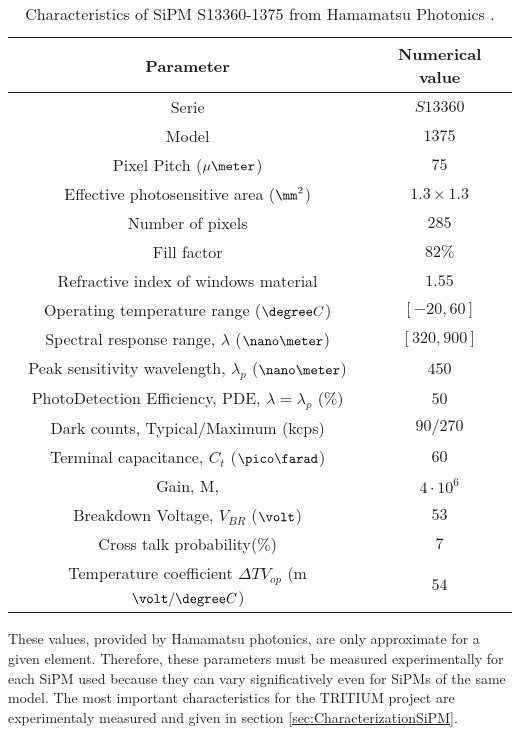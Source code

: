 \begin{table}[htbp]
\begin{center}
\begin{tabular}{|c|c|}
\hline
Parameter & Numerical value \\
\hline \hline \hline
Serie & $S13360$ \\ \hline
Model & $1375$ \\ \hline
Pixel Pitch ($\mu\meter$) & $75$ \\ \hline
Effective photosensitive area ($\mm^2$) & $1.3 \times 1.3$ \\ \hline
Number of pixels & $285$ \\ \hline
Fill factor & $82\%$ \\ \hline
Refractive index of windows material & $1.55$ \\ \hline
Operating temperature range ($\degree C$)& $[-20,60]$ \\ \hline
Spectral response range, $\lambda$ ($\nano\meter$) & $[320, 900]$ \\ \hline
Peak sensitivity wavelength, $\lambda_p$ ($\nano\meter$) & $450$ \\ \hline
PhotoDetection Efficiency, PDE, $\lambda=\lambda_p$ ($\%$) & $50$ \\ \hline
Dark counts, Typical/Maximum (kcps) & $90/270$ \\ \hline
Terminal capacitance, $C_t$ ($\pico\farad$) & $60$ \\ \hline
Gain, M, & $4 \cdot{} 10^6$ \\ \hline
Breakdown Voltage, $V_{BR}$ ($\volt$) & $53$ \\ \hline
Cross talk probability($\%$) & $7$ \\ \hline
Temperature coefficient $\Delta TV_{op}$ (m$\volt/\degree C$) & $54$ \\ \hline
\end{tabular}
\caption{Characteristics of SiPM S13360-1375 from Hamamatsu Photonics \cite{DataSheetHammamatsu_1_SiPM_1375}.}
\label{tab:PropertiesOfSiPM1375}
\end{center}
\end{table}

These values, provided by Hamamatsu photonics, are only approximate for a given element. Therefore, these parameters must be measured experimentally for each SiPM used because they can vary significatively even for SiPMs of the same model. The most important characteristics for the TRITIUM project are experimentaly measured and given in section \ref{sec:CharacterizationSiPM}. 

